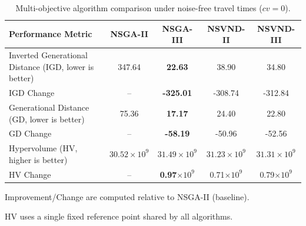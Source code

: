 \documentclass[a4paper,fleqn]{cas-sc}
\begin{document}
\begin{table}[t]
\centering
\footnotesize
\setlength{\tabcolsep}{4.5pt}
\renewcommand{\arraystretch}{1.15}
\begin{threeparttable}
\begin{tabular}{@{}l*{4}{c}@{}}
\toprule
\textbf{Performance Metric} & \textbf{NSGA-II} & \textbf{NSGA-III} & \textbf{NSVND-II} & \textbf{NSVND-III} \\
\midrule
Inverted Generational Distance (IGD, lower is better) 
& 347.64 
& \textbf{22.63} 
& 38.90 
& 34.80 \\
IGD Change\tnote{a} 
& -- 
& \textbf{-325.01} 
& -308.74 
& -312.84 \\
\midrule
Generational Distance (GD, lower is better) 
& 75.36 
& \textbf{17.17} 
& 24.40 
& 22.80 \\
GD Change\tnote{a} 
& -- 
& \textbf{-58.19} 
& -50.96 
& -52.56 \\
\midrule
Hypervolume (HV, higher is better) \tnote{b} 
& $30.52\times10^9$ 
& \textbf{$31.49\times10^9$} 
& $31.23\times10^9$ 
& $31.31\times10^9$ \\
HV Change\tnote{a} 
& -- 
& \textbf{0.97$\times10^9$} 
& 0.71$\times10^9$ 
& 0.79$\times10^9$ \\
\bottomrule
\end{tabular}

\begin{tablenotes}\footnotesize
\item[a] Improvement/Change are computed relative to NSGA-II (baseline).
\item[b] HV uses a single fixed reference point shared by all algorithms.
\end{tablenotes}
\end{threeparttable}
\caption{Multi-objective algorithm comparison under noise-free travel times ($cv=0$).}
\label{tab:algorithm_comparison_simple}
\end{table}
\end{document}
